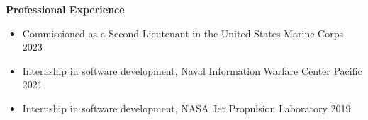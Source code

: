 \begin{vitae}
\textbf{Professional Experience}
\begin{itemize}
    \item Commissioned as a Second Lieutenant in the United States Marine Corps \hfill{2023}

    \item Internship in software development, Naval Information Warfare Center Pacific \hfill{2021}
    
    \item Internship in software development, NASA Jet Propulsion Laboratory \hfill{2019}
\end{itemize}

\end{vitae}